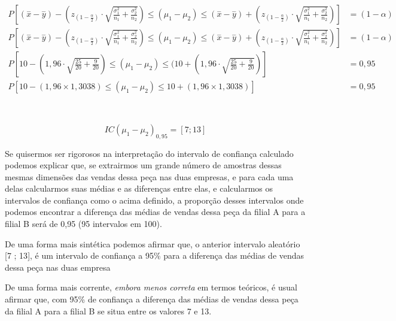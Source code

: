 \documentclass[
]{book}
\begin{document}
\hfill\break

\begin{align*}
P[(\stackrel{-}{x}-\stackrel{-}{y} ) -   ({z}_{(1-\frac{\alpha }{2})} \cdot  \sqrt{\frac{\sigma^{2}_{1}}{n_{1}} + \frac{\sigma^{2}_{2}}{n_{2}} }  ) \le (\mu_{1}-\mu_{2}) \le (\stackrel{-}{x}-\stackrel{-}{y})   +({z}_{(1-\frac{\alpha }{2})} \cdot    \sqrt{\frac{\sigma^{2}_{1}}{n_{1}} + \frac{\sigma^{2}_{2}}{n_{2}} }    )     ] & =(1-\alpha) \\
P[(\stackrel{-}{x}-\stackrel{-}{y} ) -   ({z}_{(1-\frac{\alpha }{2})} \cdot  \sqrt{\frac{\sigma^{2}_{1}}{n_{1}} + \frac{\sigma^{2}_{2}}{n_{2}} }  ) \le (\mu_{1}-\mu_{2}) \le (\stackrel{-}{x}-\stackrel{-}{y})   +({z}_{(1-\frac{\alpha }{2})} \cdot    \sqrt{\frac{\sigma^{2}_{1}}{n_{1}} + \frac{\sigma^{2}_{2}}{n_{2}} }    )     ] & = (1-\alpha) \\
P[10 - ( 1,96  \cdot  \sqrt{\frac{25}{20} + \frac{9}{20}}  ) \le (\mu_{1}-\mu_{2}) \le ( 10 +  ( 1,96  \cdot  \sqrt{\frac{25}{20} + \frac{9}{20} }  ) ] & = 0,95 \\
P[10 - (1,96 \times 1,3038) \le (\mu_{1}-\mu_{2}) \le 10 + (1,96 \times  1,3038) ] & =  0,95 
\end{align*}

~

\[
IC (\mu_{1} - \mu_{2})_{0,95} = [7; 13]
\]

\hfill\break

Se quisermos ser rigorosos na interpretação do intervalo de confiança calculado podemos explicar que, se extrairmos um grande número de amostras dessas mesmas dimensões das vendas dessa peça nas duas empresas, e para cada uma delas calcularmos suas médias e as diferenças entre elas, e calcularmos os intervalos de confiança como o acima definido, a proporção desses intervalos onde podemos encontrar a diferença das médias de vendas dessa peça da filial A para a filial B será de 0,95 (95 intervalos em 100).

\hfill\break

De uma forma mais sintética podemos afirmar que, o anterior intervalo aleatório {[}7 ; 13{]}, é um intervalo de confiança a 95\% para a diferença das médias de vendas dessa peça nas duas empresa

\hfill\break

De uma forma mais corrente, \emph{embora menos correta} em termos teóricos, é usual afirmar que, com 95\% de confiança a diferença das médias de vendas dessa peça da filial A para a filial B se situa entre os valores 7 e 13.
\end{document}
